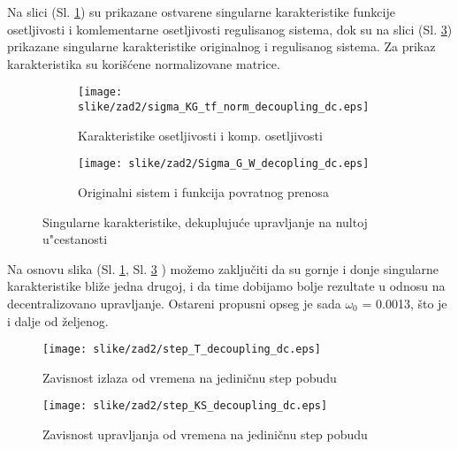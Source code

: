 \documentclass[a4paper,11pt]{article}
\theoremstyle{definition} \newtheorem{deff}{Definicija}[section]
\theoremstyle{definition} \newtheorem{prim}[deff]{Primer}
\theoremstyle{plain} \newtheorem{teor}[deff]{Teorema}
\begin{document}
	\newpage
	
	Na slici (Sl. \ref{fig:sigmaDEK0}) su prikazane ostvarene singularne karakteristike funkcije osetljivosti i komlementarne osetljivosti regulisanog sistema, dok su na slici (Sl. \ref{fig:sigmaG_W_dek0}) prikazane singularne karakteristike originalnog i regulisanog sistema. Za prikaz karakteristika su korišćene normalizovane matrice.
	
	\hspace{2cm}
	
	\begin{figure}[h]
		\centering
		\begin{subfigure}{0.6\linewidth}
			\centering
			\texttt{[image: slike/zad2/sigma\_KG\_tf\_norm\_decoupling\_dc.eps]}
			\caption{Karakteristike osetljivosti i komp. osetljivosti}
			\label{fig:sigmaDEK0}
		\end{subfigure}
		\hfill
		\begin{subfigure}{0.6\linewidth}
			\centering
			\texttt{[image: slike/zad2/Sigma\_G\_W\_decopling\_dc.eps]}
			\caption{Originalni sistem i funkcija povratnog prenosa}
			\label{fig:sigmaG_W_dek0}
		\end{subfigure}
		\caption{Singularne karakteristike, dekupluju\'ce upravljanje na nultoj u"cestanosti}
	\end{figure}
	
	\hspace{2cm}
	
	
	
	Na osnovu slika (Sl. \ref{fig:sigmaDEK0}, Sl. \ref{fig:sigmaG_W_dek0} ) možemo zaključiti da su gornje i donje singularne karakteristike bliže jedna drugoj, i da time dobijamo bolje rezultate u odnosu na decentralizovano upravljanje. Ostareni propusni opseg je sada $\omega_0$ = 0.0013, što je i dalje od željenog.
	
	\newpage
	
	\begin{figure}[!ht]
		\centering
		\texttt{[image: slike/zad2/step\_T\_decoupling\_dc.eps]}
		\caption{Zavisnost izlaza od vremena na jediničnu step pobudu}
		\label{fig:stepT_dek0}
	\end{figure}
	
	\begin{figure}[!ht]
		\centering
		\texttt{[image: slike/zad2/step\_KS\_decoupling\_dc.eps]}
		\caption{Zavisnost upravljanja od vremena na jediničnu step pobudu}
		\label{fig:stepKS_dek0}
	\end{figure}
	
\end{document}
